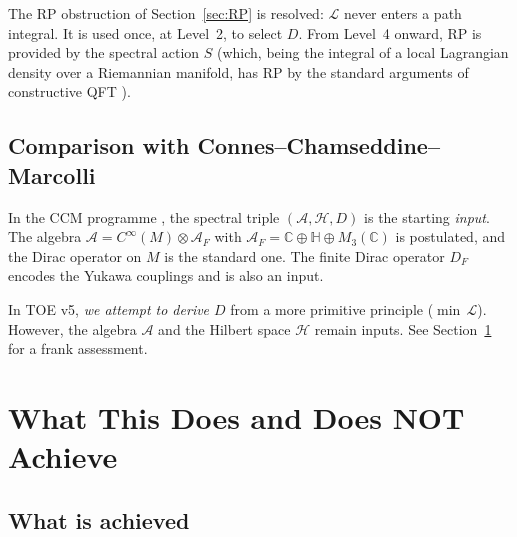 \documentclass[12pt]{article}
\theoremstyle{definition}
\theoremstyle{remark}
\begin{document}
\medskip

\noindent
The RP obstruction of Section~\ref{sec:RP} is resolved:
$\mathcal{L}$ never enters a path integral.
It is used once, at Level~2, to select $D$.
From Level~4 onward, RP is provided by the spectral action $S$
(which, being the integral of a local Lagrangian density over a
Riemannian manifold, has RP by the standard arguments of
constructive QFT \cite{GlimmJaffe1987}).

\subsection{Comparison with Connes--Chamseddine--Marcolli}

In the CCM programme \cite{ConnesChamseddine1997,CCM2007,Connes2013},
the spectral triple $(\mathcal{A},\mathcal{H},D)$ is the starting
\emph{input}.  The algebra
$\mathcal{A} = C^\infty(M) \otimes \mathcal{A}_F$
with $\mathcal{A}_F = \mathbb{C} \oplus \mathbb{H} \oplus M_3(\mathbb{C})$
is postulated, and the Dirac operator on $M$ is the standard one.
The finite Dirac operator $D_F$ encodes the Yukawa couplings and
is also an input.

In TOE v5, \emph{we attempt to derive $D$} from a more primitive
principle ($\min\,\mathcal{L}$).  However, the algebra $\mathcal{A}$
and the Hilbert space $\mathcal{H}$ remain inputs.
See Section~\ref{sec:honest} for a frank assessment.

\section{What This Does and Does NOT Achieve}
\label{sec:honest}

\subsection{What is achieved}
\end{document}
